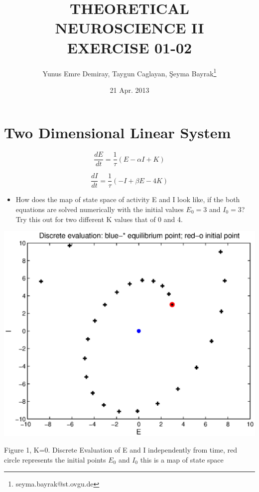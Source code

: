 \documentclass{article}
\begin{document}
\title{THEORETICAL NEUROSCIENCE II \\ EXERCISE 01-02}
\date{21 Apr. 2013}
\author[1]{Yunus Emre Demiray, Taygun Caglayan, \c{S}eyma Bayrak\thanks{seyma.bayrak@st.ovgu.de}}
\maketitle

\newpage

\section{Two Dimensional Linear System}

\begin{equation}
 \frac{dE}{dt}=\frac{1}{\tau}(E-\alpha I +K)
\end{equation}

\begin{equation}
  \frac{dI}{dt}=\frac{1}{\tau}(-I+\beta E-4K)
\end{equation}

\begin{itemize}
 \item How does the map of state space of activity E and I look like, if the both equations are solved numerically with the initial values $E_0=3$ and $I_0=3$? Try this out for two different K values that of 0 and 4. 
\end{itemize}

\begin{center}
 \includegraphics[width=\textwidth]{nonlinear1.eps}
\begin{footnotesize}Figure 1, K=0. Discrete Evaluation of E and I independently from time, red circle represents the initial points $E_0$ and $I_0$ this is a map of state space\end{footnotesize}
\end{center}
\end{document}
